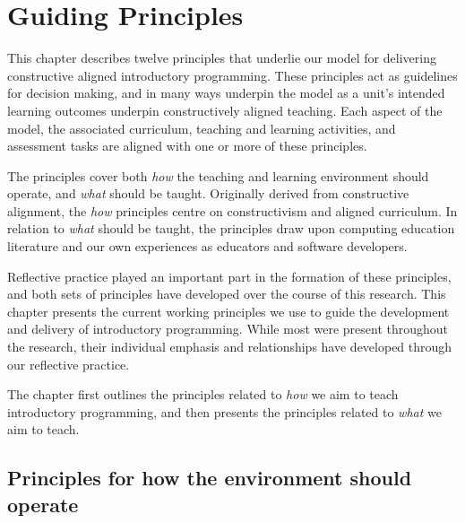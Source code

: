 
\chapter{Guiding Principles} %
\label{cha:guiding_principles}


\graphicspath{{Figures/CAApproach/}}

%
%

This chapter describes twelve principles that underlie our model for delivering constructive aligned introductory programming. These principles act as guidelines for decision making, and in many ways underpin the model as a unit's intended learning outcomes underpin constructively aligned teaching. Each aspect of the model, the associated curriculum, teaching and learning activities, and assessment tasks are aligned with one or more of these principles. 

The principles cover both \emph{how} the teaching and learning environment should operate, and \emph{what} should be taught. Originally derived from constructive alignment, the \emph{how} principles centre on constructivism and aligned curriculum. In relation to \emph{what} should be taught, the principles draw upon computing education literature and our own experiences as educators and software developers. 

Reflective practice played an important part in the formation of these principles, and both sets of principles have developed over the course of this research. This chapter presents the current working principles we use to guide the development and delivery of introductory programming. While most were present throughout the research, their individual emphasis and relationships have developed through our reflective practice. 

%
%

The chapter first outlines the principles related to \emph{how} we aim to teach introductory programming, and then presents the principles related to \emph{what} we aim to teach.


%
%



\section{Principles for how the environment should operate} %
\label{sub:principles_for_how_the_environment_should_operate}

